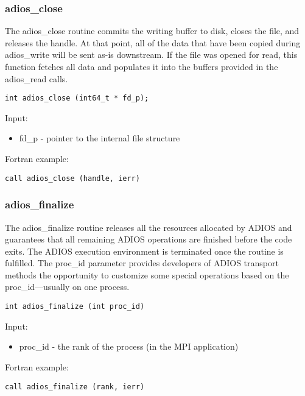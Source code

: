 \subsubsection{adios\_close}

The adios\_close routine commits the writing buffer to disk, closes 
the file, and releases the handle. At that point, all of the data that have been 
copied during adios\_write will be sent as-is downstream. If the file was opened 
for read, this function fetches all data and populates it into the 
buffers provided in the adios\_read calls. 

\begin{lstlisting}[alsolanguage=C,caption={},label={}]
int adios_close (int64_t * fd_p);
\end{lstlisting}

Input: 
\begin{itemize}
\item fd\_p - pointer to the internal file structure
\end{itemize}

Fortran example: 
\begin{lstlisting}[alsolanguage=Fortran,caption={},label={}]
call adios_close (handle, ierr)
\end{lstlisting}

\subsubsection{adios\_finalize}

The adios\_finalize routine releases all the resources allocated by ADIOS and guarantees 
that all remaining ADIOS operations are finished before the code exits. The ADIOS 
execution environment is terminated once the routine is fulfilled. The proc\_id 
parameter provides developers of ADIOS transport methods the opportunity to customize 
some special operations based on the proc\_id---usually on one process. 

\begin{lstlisting}[alsolanguage=C,caption={},label={}]
int adios_finalize (int proc_id)
\end{lstlisting}

Input: 
\begin{itemize}
\item proc\_id - the rank of the process (in the MPI application)  
\end{itemize}

Fortran example: 
\begin{lstlisting}[alsolanguage=Fortran,caption={},label={}]
call adios_finalize (rank, ierr)
\end{lstlisting}

